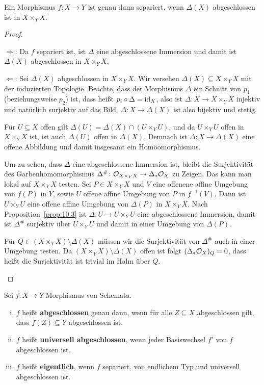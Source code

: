 \begin{prop}
	\label{prop:10.4}
	Ein Morphismus $f \colon X \to Y$ ist genau dann separiert, wenn $\Delta(X)$ abgeschlossen ist in $X \times_Y X$.
	\begin{proof}
		\begin{description}
			\item{\glqq$\boldsymbol{\Rightarrow}$\grqq:} Da $f$ separiert ist, ist $\Delta$ eine abgeschlossene Immersion und damit ist $\Delta(X)$ abgeschlossen in $X \times_Y X$.
			\item{\glqq$\boldsymbol{\Leftarrow}$\grqq:} Sei $\Delta(X)$ abgeschlossen in $X \times_Y X$. Wir versehen $\Delta(X) \subseteq X \times_Y X$ mit der induzierten Topologie. Beachte, dass der Morphismus $\Delta$ ein Schnitt von $p_1$ (beziehungsweise $p_2$) ist, dass heißt $p_i \circ \Delta = \operatorname{id}_X$, also ist $\Delta \colon X \to X \times_Y X$ injektiv und natürlich surjektiv auf das Bild. $\Delta\colon X \to \Delta(X)$ ist also bijektiv und stetig.
			
			Für $U\subseteq X$ offen gilt $\Delta(U) = \Delta(X) \cap (U \times_Y U)$, und da $U \times_Y U$ offen in $X\times_Y X$ ist, ist auch $\Delta(U)$ offen in $\Delta(X)$. Demnach ist $\Delta \colon X \to \Delta(X)$ eine offene Abbildung und damit insgesamt ein Homöomorphismus.

			Um zu sehen, dass $\Delta$ eine abgeschlossene Immersion ist, bleibt die Surjektivität des Garbenhomomorphismus $\Delta^\#\colon \mathcal{O}_{X \times_Y X} \to \Delta_*  \mathcal{O}_X$ zu Zeigen. Das kann man lokal auf $X \times_Y X$ testen. Sei $P \in X \times_Y X$ und $V$ eine offenene affine Umgebung von $f(P)$ in $Y$, sowie $U$ offene affine Umgebung von $P$ in $f^{-1}(V)$. Dann ist $U \times_Y U$ eine offene affine Umgebung von $\Delta(P)$ in $X \times_Y X$. Nach Proposition~\ref{prop:10.3} ist $\Delta\colon U \to U \times_Y U$ eine abgeschlossene Immersion, damit ist $\Delta^\#$ surjektiv über $U \times_Y U$ und damit in einer Umgebung von $\Delta(P)$.

			Für $Q \in (X \times_Y X) \setminus \Delta(X)$ müssen wir die Surjektivität von $\Delta^\#$ auch in einer Umgebung testen. Da $(X \times_Y X) \setminus \Delta(X)$ offen ist folgt $(\Delta_* \mathcal{O}_X)_Q = 0$, dass heißt die Surjektivität ist trivial im Halm über $Q$.
		\end{description}
	\end{proof}
\end{prop}

\begin{defn}
	\label{defn:10.5}
	Sei $f \colon X \to Y$ Morphismus von Schemata.
	\begin{enumerate}[i)]
		\item $f$ heißt \textbf{abgeschlossen} genau dann, wenn für alle $Z \subseteq X$ abgeschlossen gilt, dass $f(Z)\subseteq Y$ abgeschlossen ist.
		\item $f$ heißt \textbf{universell abgeschlossen}, wenn jeder Basiswechsel $f'$ von $f$ abgeschlossen ist.
		\item $f$ heißt \textbf{eigentlich}, wenn $f$ separiert, von endlichem Typ und universell abgeschlossen ist.
	\end{enumerate}
\end{defn}

